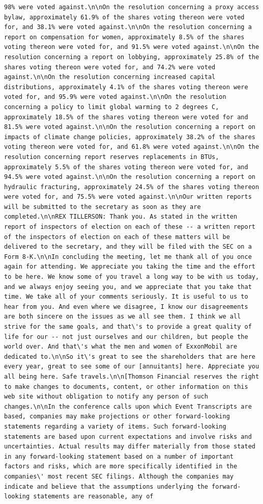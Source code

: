 \documentclass[
  letterpaper,
  DIV=11,
  numbers=noendperiod]{scrreprt}
\begin{document}
\begin{verbatim}
98% were voted against.\n\nOn the resolution concerning a proxy access bylaw, approximately 61.9% of the shares voting thereon were voted for, and 38.1% were voted against.\n\nOn the resolution concerning a report on compensation for women, approximately 8.5% of the shares voting thereon were voted for, and 91.5% were voted against.\n\nOn the resolution concerning a report on lobbying, approximately 25.8% of the shares voting thereon were voted for, and 74.2% were voted against.\n\nOn the resolution concerning increased capital distributions, approximately 4.1% of the shares voting thereon were voted for, and 95.9% were voted against.\n\nOn the resolution concerning a policy to limit global warming to 2 degrees C, approximately 18.5% of the shares voting thereon were voted for and 81.5% were voted against.\n\nOn the resolution concerning a report on impacts of climate change policies, approximately 38.2% of the shares voting thereon were voted for, and 61.8% were voted against.\n\nOn the resolution concerning report reserves replacements in BTUs, approximately 5.5% of the shares voting thereon were voted for, and 94.5% were voted against.\n\nOn the resolution concerning a report on hydraulic fracturing, approximately 24.5% of the shares voting thereon were voted for, and 75.5% were voted against.\n\nOur written reports will be submitted to the secretary as soon as they are completed.\n\nREX TILLERSON: Thank you. As stated in the written report of inspectors of election on each of these -- a written report of the inspectors of election on each of these matters will be delivered to the secretary, and they will be filed with the SEC on a Form 8-K.\n\nIn concluding the meeting, let me thank all of you once again for attending. We appreciate you taking the time and the effort to be here. We know some of you travel a long way to be with us today, and we always enjoy seeing you, and we appreciate that you take that time. We take all of your comments seriously. It is useful to us to hear from you. And even where we disagree, I know our disagreements are both sincere on the issues as we all see them. I think we all strive for the same goals, and that\'s to provide a great quality of life for our -- not just ourselves and our children, but people the world over. And that\'s what the men and women of ExxonMobil are dedicated to.\n\nSo it\'s great to see the shareholders that are here every year, great to see some of our [annuitants] here. Appreciate you all being here. Safe travels.\n\n[Thomson Financial reserves the right to make changes to documents, content, or other information on this web site without obligation to notify any person of such changes.\n\nIn the conference calls upon which Event Transcripts are based, companies may make projections or other forward-looking statements regarding a variety of items. Such forward-looking statements are based upon current expectations and involve risks and uncertainties. Actual results may differ materially from those stated in any forward-looking statement based on a number of important factors and risks, which are more specifically identified in the companies\' most recent SEC filings. Although the companies may indicate and believe that the assumptions underlying the forward-looking statements are reasonable, any of 
\end{verbatim}
\end{document}
